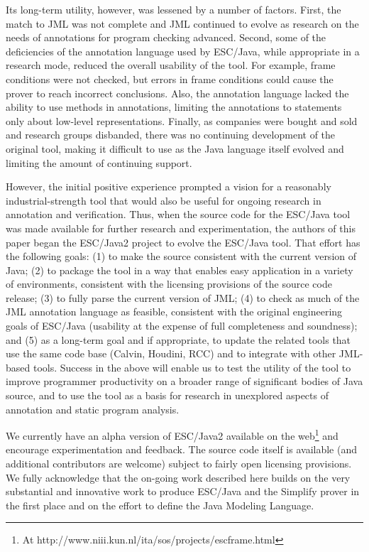 \documentclass{acm_proc_article-sp}
\begin{document}
Its long-term utility, however, was lessened by a number of factors.
First, the match to JML was not complete and JML continued to evolve
as research on the needs of annotations for program checking advanced.
Second, some of the deficiencies of the annotation language used by
ESC/Java, while appropriate in a research mode, reduced the overall
usability of the tool.  For example, frame conditions were not
checked, but errors in frame conditions could cause the prover to
reach incorrect conclusions.  Also, the annotation language lacked the
ability to use methods in annotations, limiting the annotations to
statements only about low-level representations.  Finally, as
companies were bought and sold and research groups disbanded, there
was no continuing development of the original tool, making it
difficult to use as the Java language itself evolved and limiting the
amount of continuing support.

However, the initial positive experience prompted a vision for a
reasonably industrial-strength tool that would also be useful for
ongoing research in annotation and verification.  Thus, when the
source code for the ESC/Java tool was made available for further
research and experimentation, the authors of this paper began the
ESC/Java2 project to evolve the ESC/Java tool.  That effort has the
following goals:
(1) to make the source consistent with the current version of Java;
(2) to package the tool in a way that enables easy application in a
  variety of environments, consistent with the licensing provisions of
  the source code release;
(3) to fully parse the current version of JML;
(4) to check as much of the JML annotation language as feasible,
  consistent with the original engineering goals of ESC/Java
  (usability at the expense of full completeness and soundness);
and (5) as a long-term goal and if appropriate, to update the related
  tools that use the same code base (Calvin, Houdini, RCC) and to
 integrate with other JML-based tools.
Success in the above will enable us to
 test the utility of the tool to improve programmer productivity
 on a broader range of significant
  bodies of Java source, and
to use the tool as a basis for research in unexplored aspects of
  annotation and static program analysis.

We currently have an alpha version of ESC/Java2 available on the
web\footnote{At 
{http://www.niii.kun.nl/ita/sos/projects/escframe.html}}
and encourage experimentation and feedback.  The source code itself is
available (and additional contributors are welcome) subject to fairly
open licensing provisions.  We fully acknowledge that the on-going
work described here builds on the very substantial and innovative work
to produce ESC/Java and the Simplify prover in the first place and on
the effort to define the Java Modeling Language.
\end{document}
